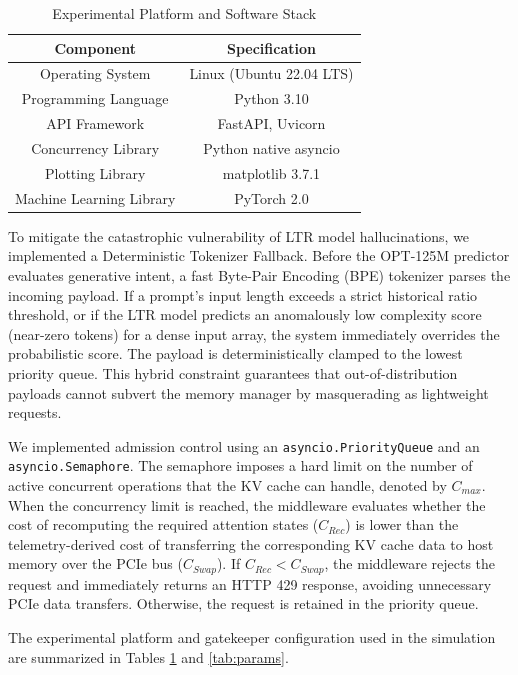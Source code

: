 \documentclass[conference]{IEEEtran}
\begin{document}
\begin{table}[h]
\caption{Experimental Platform and Software Stack}
\begin{center}
\begin{tabular}{|c|c|}
\hline
\textbf{Component} & \textbf{Specification} \\
\hline
Operating System & Linux (Ubuntu 22.04 LTS) \\
Programming Language & Python 3.10 \\
API Framework & FastAPI, Uvicorn \\
Concurrency Library & Python native asyncio \\
Plotting Library & matplotlib 3.7.1 \\
Machine Learning Library & PyTorch 2.0 \\
\hline
\end{tabular}
\label{tab:setup}
\end{center}
\end{table}

To mitigate the catastrophic vulnerability of LTR model hallucinations, we implemented a Deterministic Tokenizer Fallback. Before the OPT-125M predictor evaluates generative intent, a fast Byte-Pair Encoding (BPE) tokenizer parses the incoming payload. If a prompt's input length exceeds a strict historical ratio threshold, or if the LTR model predicts an anomalously low complexity score (near-zero tokens) for a dense input array, the system immediately overrides the probabilistic score. The payload is deterministically clamped to the lowest priority queue. This hybrid constraint guarantees that out-of-distribution payloads cannot subvert the memory manager by masquerading as lightweight requests.

We implemented admission control using an \texttt{asyncio.PriorityQueue} and an \texttt{asyncio.Semaphore}. The semaphore imposes a hard limit on the number of active concurrent operations that the KV cache can handle, denoted by $C_{max}$. When the concurrency limit is reached, the middleware evaluates whether the cost of recomputing the required attention states ($C_{Rec}$) is lower than the telemetry-derived cost of transferring the corresponding KV cache data to host memory over the PCIe bus ($C_{Swap}$). If $C_{Rec} < C_{Swap}$, the middleware rejects the request and immediately returns an HTTP 429 response, avoiding unnecessary PCIe data transfers. Otherwise, the request is retained in the priority queue.

The experimental platform and gatekeeper configuration used in the simulation are summarized in Tables \ref{tab:setup} and \ref{tab:params}.
\end{document}
